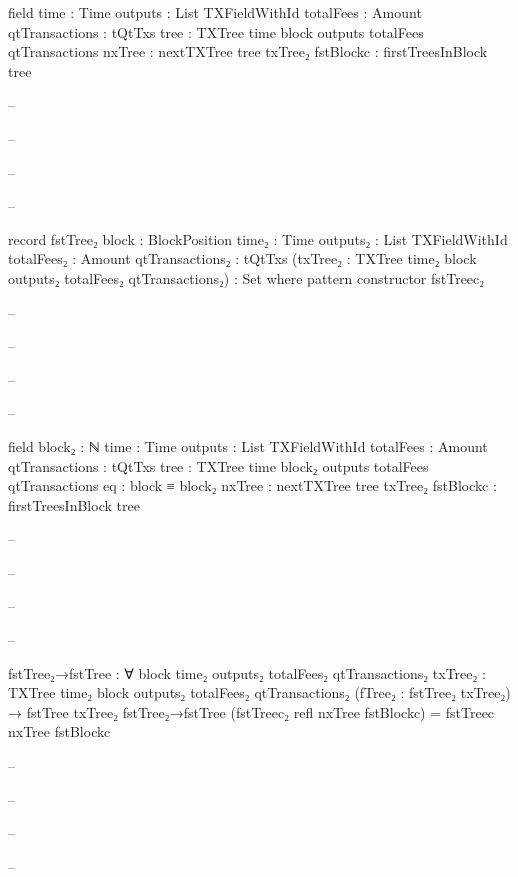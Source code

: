 \documentclass{beamer}
\begin{document}
{\begin{frame}
\begin{code}
        field
          {time}               : Time
          {outputs}            : List TXFieldWithId
          {totalFees}          : Amount
          {qtTransactions}     : tQtTxs
          {tree}               : TXTree time block
            outputs totalFees qtTransactions
          nxTree               : nextTXTree tree txTree₂
          fstBlockc            : firstTreesInBlock tree

-- \end{code}
-- \end{frame}
-- \begin{frame}
-- \begin{code}

      record fstTree₂
        {block : BlockPosition}
        {time₂ : Time}
        {outputs₂ : List TXFieldWithId}
        {totalFees₂ : Amount}
        {qtTransactions₂ : tQtTxs}
        (txTree₂ : TXTree time₂ block outputs₂ totalFees₂
          qtTransactions₂)
        : Set where
        pattern
        constructor fstTreec₂

-- \end{code}
-- \end{frame}
-- \begin{frame}
-- \begin{code}

        field
          {block₂}              : ℕ
          {time}               : Time
          {outputs}            : List TXFieldWithId
          {totalFees}          : Amount
          {qtTransactions}     : tQtTxs
          {tree}               : TXTree time block₂
            outputs totalFees qtTransactions
          eq                   : block ≡ block₂
          nxTree               : nextTXTree tree txTree₂
          fstBlockc            : firstTreesInBlock tree

-- \end{code}
-- \end{frame}
-- \begin{frame}
-- \begin{code}

      fstTree₂→fstTree : ∀
        {block time₂ outputs₂ totalFees₂ qtTransactions₂}
        {txTree₂ : TXTree time₂ block outputs₂ totalFees₂
          qtTransactions₂}
        (fTree₂ : fstTree₂ txTree₂)
        → fstTree txTree₂
      fstTree₂→fstTree (fstTreec₂ refl nxTree fstBlockc)
        = fstTreec nxTree fstBlockc

-- \end{code}
-- \end{frame}
-- \begin{frame}
-- \begin{code}


\end{code}
\end{frame}}
\end{document}
